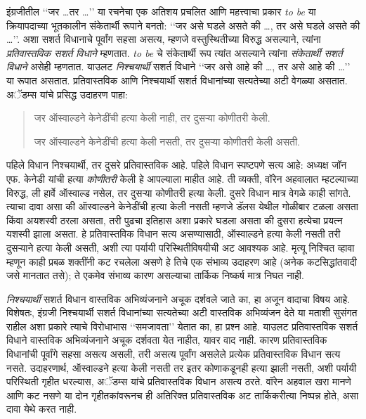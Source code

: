 इंग्रजीतील ‘‘जर \dots तर \dots’’
या रचनेचा एक अतिशय प्रचलित आणि
महत्त्वाचा प्रकार \emph{to be}
या क्रियापदाच्या भूतकालीन
संकेतार्थी रूपाने बनतो:
‘‘जर असे घडले असते की \dots,
तर असे घडले असते की \dots’’.
अशा सशर्त विधानाचे पूर्वांग
सहसा असत्य, म्हणजे वस्तुस्थितीच्या
विरुद्ध असल्याने, त्यांना
\emph{प्रतिवास्तविक सशर्त विधाने}
म्हणतात. \emph{to be} चे
संकेतार्थी रूप त्यांत असल्याने
त्यांना \emph{संकेतार्थी सशर्त विधाने}
असेही म्हणतात. याउलट
\emph{निश्चयार्थी} सशर्त विधाने
‘‘जर असे आहे की \dots,
तर असे आहे की \dots’’
या रूपात असतात. प्रतिवास्तविक
आणि निश्चयार्थी सशर्त विधानांच्या
सत्यतेच्या अटी वेगळ्या असतात.
अॅडम्स यांचे प्रसिद्ध उदाहरण पाहा:
\begin{quote}
  जर ऑस्वाल्डने केनेडींची हत्या केली नाही,
  तर दुसऱ्या कोणीतरी केली.

  जर ऑस्वाल्डने केनेडींची हत्या केली
  नसती, तर दुसऱ्या कोणीतरी केली असती.
\end{quote}
पहिले विधान निश्चयार्थी, तर दुसरे
प्रतिवास्तविक आहे. पहिले विधान
स्पष्टपणे सत्य आहे: अध्यक्ष जॉन
एफ. केनेडी यांची हत्या
\emph{कोणीतरी} केली हे आपल्याला
माहीत आहे. ती व्यक्ती,
वॉरेन अहवालात म्हटल्याच्या विरुद्ध,
ली हार्वे ऑस्वाल्ड नसेल,
तर दुसऱ्या कोणीतरी हत्या
केली. दुसरे विधान मात्र
वेगळे काही सांगते. त्याचा
दावा असा की ऑस्वाल्डने
केनेडींची हत्या केली नसती
म्हणजे डॅलस येथील गोळीबार
टळला असता किंवा अयशस्वी
ठरला असता, तरी पुढचा
इतिहास अशा प्रकारे घडला
असता की दुसरा हत्येचा
प्रयत्न यशस्वी झाला असता.
हे प्रतिवास्तविक विधान सत्य असण्यासाठी, ऑस्वाल्डने
हत्या केली नसती तरी दुसऱ्याने हत्या केली असती,
अशी त्या पर्यायी परिस्थितीविषयीची अट आवश्यक आहे.
मृत्यू निश्चित व्हावा म्हणून काही प्रबळ शक्तींनी
कट रचलेला असणे हे तिचे एक संभाव्य उदाहरण आहे
(अनेक कटसिद्धांतवादी जसे मानतात तसे); ते एकमेव
संभाव्य कारण असल्याचा तार्किक निष्कर्ष मात्र निघत नाही.

\emph{निश्चयार्थी} सशर्त विधान
वास्तविक अभिव्यंजनाने अचूक
दर्शवले जाते का, हा अजून
वादाचा विषय आहे. विशेषतः,
इंग्रजी निश्चयार्थी सशर्त
विधानांच्या सत्यतेच्या अटी
वास्तविक अभिव्यंजन देते
या मताशी सुसंगत राहील
अशा प्रकारे त्याचे
विरोधाभास ‘‘समजावता’’
येतात का, हा प्रश्न
आहे. याउलट प्रतिवास्तविक
सशर्त विधाने वास्तविक
अभिव्यंजनाने अचूक
दर्शवता येत नाहीत,
यावर वाद नाही.
कारण प्रतिवास्तविक
विधानांची पूर्वांगे
सहसा असत्य असली,
तरी असत्य पूर्वांग
असलेले प्रत्येक
प्रतिवास्तविक विधान
सत्य नसते. उदाहरणार्थ,
ऑस्वाल्डने हत्या केली नसती तर इतर कोणाकडूनही
हत्या झाली नसती, अशी पर्यायी परिस्थिती गृहीत धरल्यास,
अॅडम्स यांचे प्रतिवास्तविक विधान असत्य ठरते.
वॉरेन अहवाल खरा मानणे आणि कट नसणे या दोन
गृहीतकांवरूनच ही अतिरिक्त प्रतिवास्तविक अट
तार्किकरीत्या निष्पन्न होते, असा दावा येथे करत नाही.

